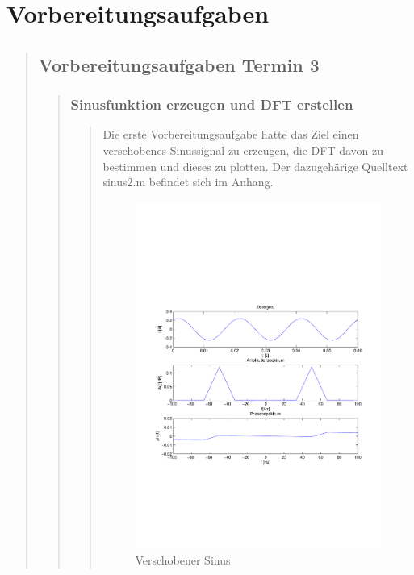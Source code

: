 \section{Vorbereitungsaufgaben}
\begin{quote}
    \subsection{Vorbereitungsaufgaben Termin 3}
    \begin{quote}
        \subsubsection{Sinusfunktion erzeugen und DFT erstellen}
        \begin{quote}
            Die erste Vorbereitungsaufgabe hatte das Ziel einen verschobenes Sinussignal zu erzeugen, die DFT davon zu
            bestimmen und dieses zu plotten. Der dazugehärige Quelltext sinus2.m
            befindet sich im Anhang.
            \begin{figure}[H]
            \centering
                \includegraphics[scale=0.5, trim = 1cm 6cm 1.5cm 8cm, clip]{./Bilder/VerschobenerSinusAufgabe1}
                    \caption{Verschobener Sinus}
                    \label{fig:./Bilder/VerschobenerSinusAufgabe1}
            \end{figure}
        

\end{quote}
\end{quote}
\end{quote}
